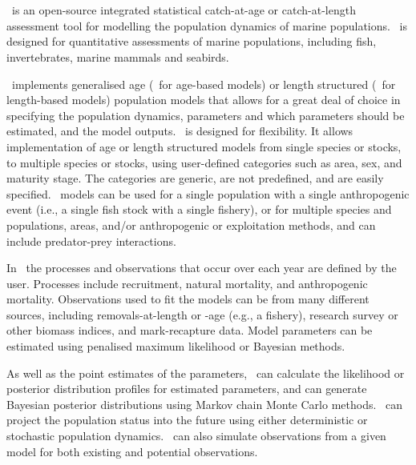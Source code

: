 \section{\label{sec:Introduction}}

\subsection{}

\CNAME\ is an open-source integrated statistical catch-at-age or catch-at-length assessment tool for modelling the population dynamics of marine populations. \CNAME\ is designed for quantitative assessments of marine populations, including fish, invertebrates, marine mammals and seabirds.

\CNAME\ implements generalised age (\CNAME\ for age-based models) or length structured (\CNAME\ for length-based models) population models that allows for a great deal of choice in specifying the population dynamics, parameters and which parameters should be estimated, and the model outputs. \CNAME\ is designed for flexibility. It allows implementation of age or length structured models from single species or stocks, to multiple species or stocks, using user-defined categories such as area, sex, and maturity stage. The categories are generic, are not predefined, and are easily specified. \CNAME\ models can be used for a single population with a single anthropogenic event (i.e., a single fish stock with a single fishery), or for multiple species and populations, areas, and/or anthropogenic or exploitation methods, and can include predator-prey interactions.

In \CNAME\ the processes and observations that occur over each year are defined by the user. Processes include recruitment, natural mortality, and anthropogenic mortality. Observations used to fit the models can be from many different sources, including removals-at-length or -age (e.g., a fishery), research survey or other biomass indices, and mark-recapture data. Model parameters can be estimated using penalised maximum likelihood or Bayesian methods.

As well as the point estimates of the parameters, \CNAME\ can calculate the likelihood or posterior distribution profiles for estimated parameters, and can generate Bayesian posterior distributions using Markov chain Monte Carlo methods. \CNAME\ can project the population status into the future using either deterministic or stochastic population dynamics. \CNAME\ can also simulate observations from a given model for both existing and potential observations.

